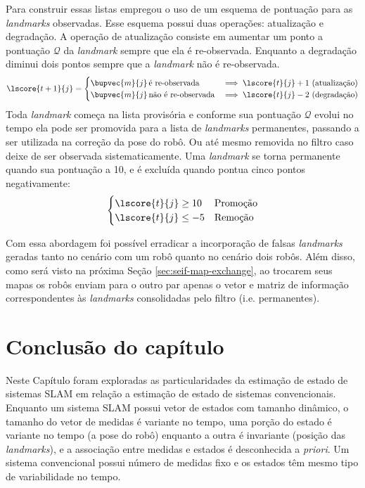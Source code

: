 Para construir essas listas \cite{saputra2019implementation} empregou 
o uso de um esquema de pontuação para as 
\textit{landmarks} observadas. Esse esquema possui duas operações: 
atualização e degradação. A operação de atualização consiste em 
aumentar um ponto a pontuação $\mathcal{Q}$ da \textit{landmark} sempre que ela 
é re-observada. Enquanto a degradação diminui dois pontos sempre que a 
\textit{landmark} não é re-observada.
\begin{equation}
  \lscore{t+1}{j} = \begin{cases}
    \bupvec{m}{j}\, \text{é re-observada} &\implies \lscore{t}{j} + 1 \,\, \text{(atualização)}\\
    \bupvec{m}{j}\, \text{não é re-observada} &\implies \lscore{t}{j} - 2 \,\, \text{(degradação)}\\
  \end{cases}
  \label{eq:landmark-quality}
\end{equation}
Toda \textit{landmark} começa na lista provisória e conforme sua 
pontuação $\mathcal{Q}$ evolui no tempo ela pode ser promovida para a 
lista de \textit{landmarks} permanentes, passando a ser utilizada na 
correção da pose do robô. Ou até mesmo removida no filtro caso deixe de 
ser observada sistematicamente. Uma \textit{landmark} se torna 
permanente quando sua pontuação a 10, e é excluída quando pontua 
cinco pontos negativamente:
\begin{equation}
  \begin{cases}
    \lscore{t}{j} \geq 10 & \text{Promoção}\\
    \lscore{t}{j} \leq -5 & \text{Remoção}\\
  \end{cases} 
\end{equation}

Com essa abordagem foi possível erradicar a incorporação de 
falsas \textit{landmarks} geradas tanto no cenário com um robô quanto 
no cenário dois robôs. Além disso, como será visto na próxima Seção \ref{sec:seif-map-exchange}, ao trocarem seus mapas os robôs enviam para o 
outro par apenas o vetor e matriz de informação correspondentes às 
\textit{landmarks} consolidadas pelo filtro (i.e. permanentes).

\section{Conclusão do capítulo}
Neste Capítulo foram exploradas as particularidades da estimação de 
estado de sistemas SLAM em relação a estimação de estado de sistemas 
convencionais. Enquanto um sistema SLAM possui vetor de estados com 
tamanho dinâmico, o tamanho do vetor de medidas é variante no tempo, uma porção do estado é variante no tempo (a pose do robô) enquanto a 
outra é invariante (posição das \textit{landmarks}), e a associação 
entre medidas e estados é desconhecida a \textit{priori}. Um sistema convencional possui número de medidas fixo e os estados têm mesmo 
tipo de variabilidade no tempo. 

